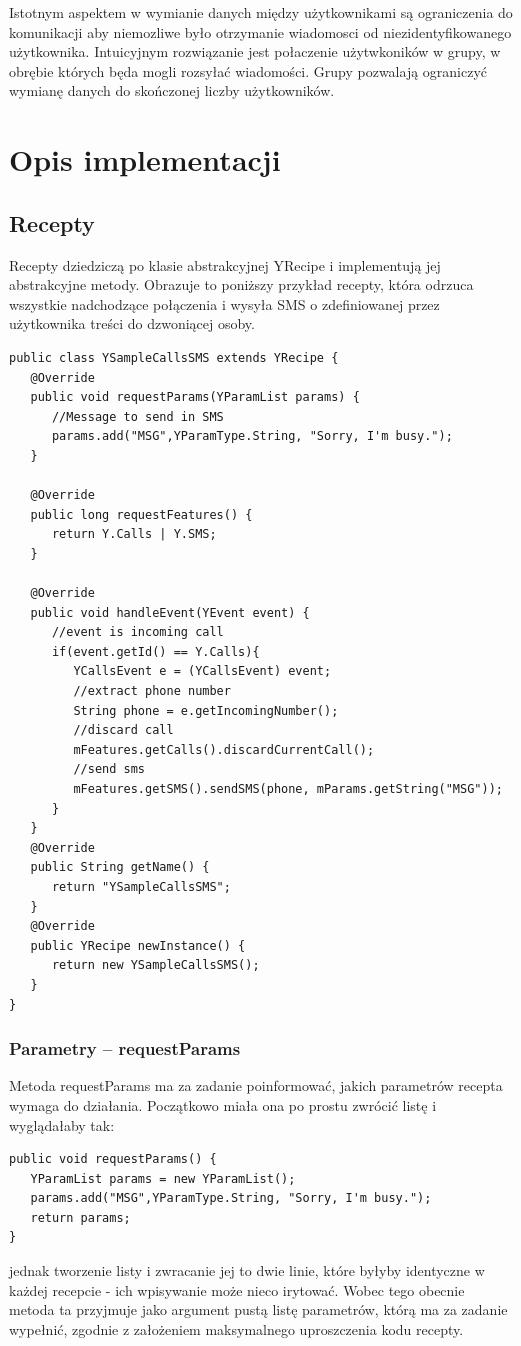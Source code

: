 \documentclass[11pt,a4paper,polish,thesis]{dcsbook}
\begin{document}
Istotnym aspektem w wymianie danych między użytkownikami są ograniczenia do komunikacji aby niemozliwe było otrzymanie wiadomosci od niezidentyfikowanego użytkownika.
Intuicyjnym rozwiązanie jest połaczenie użytwkoników w grupy, w obrębie których będa mogli rozsyłać wiadomości.
Grupy pozwalają ograniczyć wymianę danych do skończonej liczby użytkowników.



\chapter{Opis implementacji}

\section{Recepty}
Recepty dziedziczą po klasie abstrakcyjnej YRecipe i implementują jej abstrakcyjne metody. Obrazuje to poniższy przykład recepty, która odrzuca wszystkie nadchodzące połączenia i wysyła SMS o zdefiniowanej przez użytkownika treści do dzwoniącej osoby.

\begin{verbatim}
public class YSampleCallsSMS extends YRecipe {
   @Override
   public void requestParams(YParamList params) {
      //Message to send in SMS
      params.add("MSG",YParamType.String, "Sorry, I'm busy.");
   }

   @Override
   public long requestFeatures() {
      return Y.Calls | Y.SMS;
   }

   @Override
   public void handleEvent(YEvent event) {
      //event is incoming call
      if(event.getId() == Y.Calls){
         YCallsEvent e = (YCallsEvent) event;
         //extract phone number
         String phone = e.getIncomingNumber();
         //discard call
         mFeatures.getCalls().discardCurrentCall();
         //send sms
         mFeatures.getSMS().sendSMS(phone, mParams.getString("MSG"));
      }
   }
   @Override
   public String getName() {
      return "YSampleCallsSMS";
   }
   @Override
   public YRecipe newInstance() {
      return new YSampleCallsSMS();
   }
}
\end{verbatim}
\subsection{Parametry -- requestParams}
Metoda requestParams ma za zadanie poinformować, jakich parametrów recepta wymaga do działania. Początkowo miała ona po prostu zwrócić listę i wyglądałaby tak:
\begin{verbatim}
public void requestParams() {
   YParamList params = new YParamList();
   params.add("MSG",YParamType.String, "Sorry, I'm busy.");
   return params;
}
\end{verbatim}
jednak tworzenie listy i zwracanie jej to dwie linie, które byłyby identyczne w każdej recepcie - ich wpisywanie może nieco irytować. Wobec tego obecnie metoda ta przyjmuje jako argument pustą listę parametrów, którą ma za zadanie wypełnić, zgodnie z założeniem maksymalnego uproszczenia kodu recepty.
\end{document}

